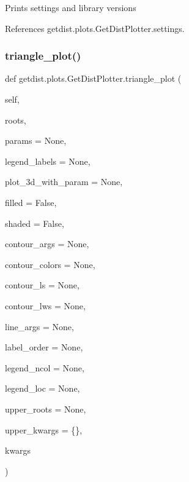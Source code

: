 \begin{DoxyVerb}Prints settings and library versions
\end{DoxyVerb}
 

References getdist.\+plots.\+Get\+Dist\+Plotter.\+settings.

\mbox{\label{classgetdist_1_1plots_1_1GetDistPlotter_a92380ecaa3180adba902208e5d646329}} 
\subsubsection{\texorpdfstring{triangle\+\_\+plot()}{triangle\_plot()}}
{\footnotesize\ttfamily def getdist.\+plots.\+Get\+Dist\+Plotter.\+triangle\+\_\+plot (\begin{DoxyParamCaption}\item[{}]{self,  }\item[{}]{roots,  }\item[{}]{params = {\ttfamily None},  }\item[{}]{legend\+\_\+labels = {\ttfamily None},  }\item[{}]{plot\+\_\+3d\+\_\+with\+\_\+param = {\ttfamily None},  }\item[{}]{filled = {\ttfamily False},  }\item[{}]{shaded = {\ttfamily False},  }\item[{}]{contour\+\_\+args = {\ttfamily None},  }\item[{}]{contour\+\_\+colors = {\ttfamily None},  }\item[{}]{contour\+\_\+ls = {\ttfamily None},  }\item[{}]{contour\+\_\+lws = {\ttfamily None},  }\item[{}]{line\+\_\+args = {\ttfamily None},  }\item[{}]{label\+\_\+order = {\ttfamily None},  }\item[{}]{legend\+\_\+ncol = {\ttfamily None},  }\item[{}]{legend\+\_\+loc = {\ttfamily None},  }\item[{}]{upper\+\_\+roots = {\ttfamily None},  }\item[{}]{upper\+\_\+kwargs = {\ttfamily \{\}},  }\item[{}]{kwargs }\end{DoxyParamCaption})}

